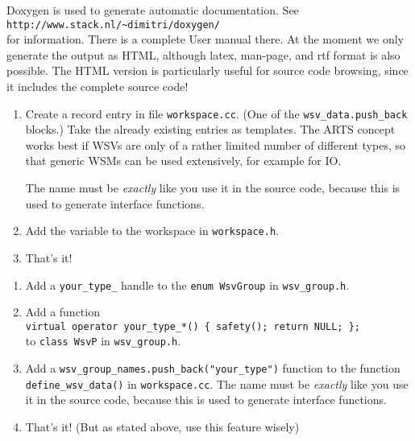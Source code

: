 Doxygen is used to generate automatic documentation. See\\
\verb|http://www.stack.nl/~dimitri/doxygen/|\\
for information. There is a complete 
User manual there. At the moment we only generate the output as HTML,
although latex, man-page, and rtf format is also possible. The HTML
version is particularly useful for source code browsing, since it
includes the complete source code!


 \label{sec:development:extending}

\begin{enumerate}
\item Create a record entry in file \verb|workspace.cc|. (One of the
  \verb|wsv_data.push_back| blocks.) Take the already existing
  entries as templates. The ARTS concept works best if WSVs are only
  of a rather limited number of different types, so that generic WSMs
  can be used extensively, for example for IO.
      
  The name must be \emph{exactly} like you use it in the source code,
  because this is used to generate interface functions.
\item Add the variable to the workspace in \verb|workspace.h|.
\item That's it!
\end{enumerate}


\begin{enumerate}
\item Add a \verb|your_type_| handle to the \verb|enum WsvGroup| in
  \verb|wsv_group.h|.  
\item Add a function\\
  \verb|virtual operator your_type_*() { safety(); return NULL; };|\\
  to \verb|class WsvP| in \verb|wsv_group.h|.
\item Add a \verb|wsv_group_names.push_back("your_type")| function to
  the function \verb|define_wsv_data()| in \verb|workspace.cc|. The
  name must be \emph{exactly} like you use it in the source code,
  because this is used to generate interface functions.
\item That's it! (But as stated above, use this feature wisely)
\end{enumerate}



